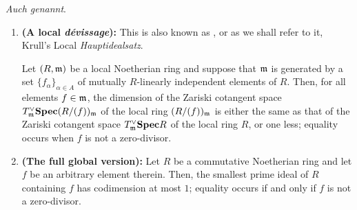             \begin{lemma} \label{lemma: krull_principal_ideal_theorem} 
                \textit{Auch  genannt}.
                \begin{enumerate}
                    \item \textbf{(A local \textit{d\'evissage}):} This is also known as  \cite[Exercise 12.1.B]{risingsea}, or as we shall refer to it, Krull's Local \textit{Hauptidealsatz}.
                    
                    Let $(R, \mathfrak{m})$ be a local Noetherian ring and suppose that $\mathfrak{m}$ is generated by a set $\{f_{\alpha}\}_{\alpha \in A}$ of mutually $R$-linearly independent elements of $R$. Then, for all elements $f \in \mathfrak{m}$, the dimension of the Zariski cotangent space $T^{\vee}_{\mathfrak{m}}\mathbf{Spec} (R/(f))_{\mathfrak{m}}$ of the local ring $(R/(f))_{\mathfrak{m}}$ is either the same as that of the Zariski cotangent space $T^{\vee}_{\mathfrak{m}}\mathbf{Spec} R$ of the local ring $R$, or one less; equality occurs when $f$ is not a zero-divisor.  
                    \item \textbf{(The full global version):} 
                    Let $R$ be a commutative Noetherian ring and let $f$ be an arbitrary element therein. Then, the smallest prime ideal of $R$ containing $f$ has codimension at most $1$; equality occurs if and only if $f$ is not a zero-divisor.
                \end{enumerate}
            \end{lemma}
